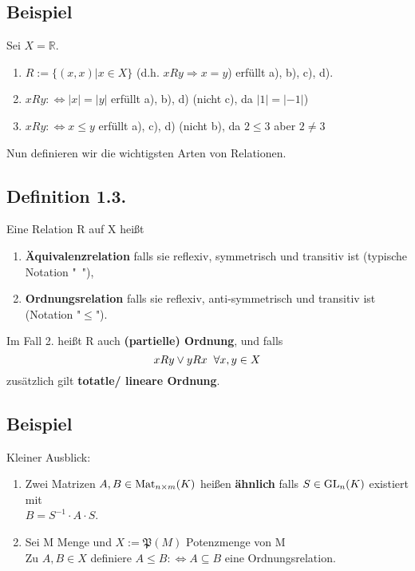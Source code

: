 \documentclass {article}
\begin{document}
\subsection*{Beispiel} 
Sei $X = \mathbb R$.
\begin{enumerate}[label=(\alph*)]
\item $ R:=\{(x,x) | x\in X\}$ (d.h. $xRy \Rightarrow x=y$) erfüllt a), b), c), d).
\item $ xRy :\iff |x|=|y|$ erfüllt a), b), d) (nicht c), da $|1|=|-1|$)
\item $ xRy :\iff x\leq y$ erfüllt a), c), d) (nicht b), da $2\leq 3$ aber $2 \neq 3$
\end{enumerate}
Nun definieren wir die wichtigsten Arten von Relationen.

\subsection*{Definition 1.3.}
Eine Relation R auf X heißt
\begin{enumerate}
\item \textbf{Äquivalenzrelation} falls sie reflexiv, symmetrisch und transitiv ist (typische Notation "~"),
\item \textbf{Ordnungsrelation} falls sie reflexiv, anti-symmetrisch und transitiv ist (Notation "$\leq$").
\end{enumerate}
Im Fall 2. heißt R auch \textbf{(partielle) Ordnung}, und falls 
$$ xRy \lor yRx \hspace*{2mm} \forall x,y \in X$$
zusätzlich gilt \textbf{totatle/ lineare Ordnung}.

\subsection*{Beispiel}
Kleiner Ausblick:
\begin{enumerate}[label=(\alph*)]
\item Zwei Matrizen $A,B \in \textnormal{Mat}_{n{\times}m}(K)$ heißen \textbf{ähnlich} falls $S \in \textnormal{GL}_n(K)$ existiert mit \\$B=S^{-1}{\cdot}A{\cdot}S$.
\item Sei M Menge und $X:=\mathfrak P(M)$ Potenzmenge von M\\
 Zu $A,B \in X$ definiere $A\leq B :\iff A\subseteq B$ eine Ordnungsrelation.
\end{enumerate}
\end{document}
